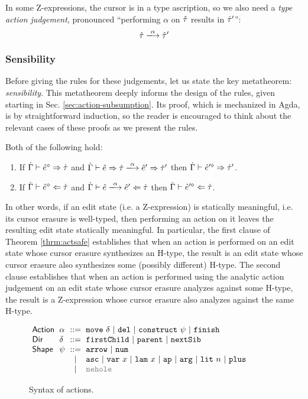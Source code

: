 In some Z-expressions, the cursor is in a type ascription, so we also need
a \emph{type action judgement}, pronounced ``performing $\alpha$ on $\hat{\tau}$
results in $\hat{\tau}'$'':
\[
\performTyp{\ztau}{\alpha}{\ztau'}
\]

\subsubsection{Sensibility}


Before giving the rules for these judgements, let us state the key
metatheorem: \emph{sensibility}. This metatheorem deeply informs the design
of the rules, given starting in Sec. \ref{sec:action-subsumption}. Its
proof, which is mechanized in Agda, is by straightforward induction, so the
reader is encouraged to think about the relevant cases of these proofs as
we present the rules.
\begin{theorem}
  \label{thrm:actsafe} Both of the following hold:
  \begin{enumerate}[itemsep=0px,partopsep=0px,topsep=0px]
  \item If $\dot{\Gamma} \vdash \hat{e}^{\diamond} \Rightarrow \dot{\tau}$ and
    $\performSyn{\hGamma}{\zexp}{\htau}{\alpha}{\zexp'}{\htau'}$ then
    $\dot{\Gamma} \vdash \hat{e}'^{\diamond} \Rightarrow \dot{\tau}'$.
  \item If $\dot{\Gamma} \vdash \hat{e}^{\diamond} \Leftarrow \dot{\tau}$ and
    $\performAna{\hGamma}{\zexp}{\htau}{\alpha}{\zexp'}$ then
    $\dot{\Gamma} \vdash \hat{e}'^{\diamond} \Leftarrow \dot{\tau}$.
  \end{enumerate}
\end{theorem}
\noindent In other words, if an edit state (i.e. a Z-expression) is
statically meaningful, i.e. its cursor erasure is well-typed, then
performing an action on it leaves the resulting edit state statically
meaningful. In particular, the first clause of Theorem \ref{thrm:actsafe}
establishes that when an action is performed on an edit state whose cursor
erasure synthesizes an H-type, the result is an edit state whose cursor
erasure also synthesizes some (possibly different) H-type. The second
clause establishes that when an action is performed using the analytic
action judgement on an edit state whose cursor erasure analyzes against
some H-type, the result is a Z-expression whose cursor erasure also
analyzes against the same H-type.

\begin{figure}[t]
\hspace{-3px}$\arraycolsep=3pt\begin{array}{llcllll}
\mathsf{Action} & \alpha & ::= &
  \aMove{\delta} ~\vert~
  \aDel ~\vert~
  \aConstruct{\psi} ~\vert~
  \aFinish\\
\mathsf{Dir} & \delta & ::= &
  \dChild ~\vert~
  \dParent ~\vert~
  \dNext \\
\mathsf{Shape} & \psi & ::= &
  \farr ~\vert~
  \fnum \\
& & \vert &
  \fasc ~\vert~
  \fvar{x} ~\vert~
  \flam{x} ~\vert~
  \fap ~\vert~
  \farg ~\vert~
  \fnumlit{n} ~\vert~
  \fplus\\
& & \vert &
  {\color{gray}\fnehole}
\end{array}$
\caption{Syntax of actions.}
\label{fig:action-syntax}
\end{figure}

